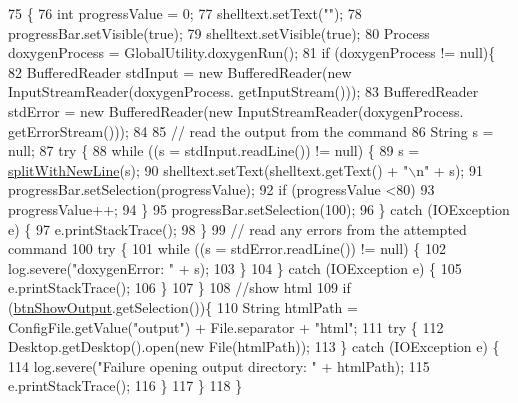 \begin{DoxyCode}
75                               \{
76         \textcolor{keywordtype}{int} progressValue = 0;
77         shelltext.setText(\textcolor{stringliteral}{""});
78         progressBar.setVisible(\textcolor{keyword}{true});
79         shelltext.setVisible(\textcolor{keyword}{true});
80         Process doxygenProcess = GlobalUtility.doxygenRun();
81         \textcolor{keywordflow}{if} (doxygenProcess != null)\{
82             BufferedReader stdInput = \textcolor{keyword}{new} BufferedReader(\textcolor{keyword}{new} InputStreamReader(doxygenProcess.
      getInputStream()));
83             BufferedReader stdError = \textcolor{keyword}{new} BufferedReader(\textcolor{keyword}{new} InputStreamReader(doxygenProcess.
      getErrorStream()));
84 
85             \textcolor{comment}{// read the output from the command}
86             String s = null;
87             \textcolor{keywordflow}{try} \{
88                 \textcolor{keywordflow}{while} ((s = stdInput.readLine()) != null) \{
89                     s = \hyperlink{classit_1_1isislab_1_1masonhelperdocumentation_1_1mason_1_1wizards_1_1_q___end_wizard_a1cdec1efdad895973386d4679b790a1c}{splitWithNewLine}(s);
90                     shelltext.setText(shelltext.getText() + \textcolor{stringliteral}{"\(\backslash\)n"} + s);
91                     progressBar.setSelection(progressValue);
92                     \textcolor{keywordflow}{if} (progressValue <80)
93                         progressValue++;
94                 \}
95                 progressBar.setSelection(100);
96             \} \textcolor{keywordflow}{catch} (IOException e) \{
97                 e.printStackTrace();
98             \}
99             \textcolor{comment}{// read any errors from the attempted command}
100             \textcolor{keywordflow}{try} \{
101                 \textcolor{keywordflow}{while} ((s = stdError.readLine()) != null) \{                 
102                     log.severe(\textcolor{stringliteral}{"doxygenError: "} + s);
103                 \}
104             \} \textcolor{keywordflow}{catch} (IOException e) \{
105                 e.printStackTrace();
106             \}
107         \}
108         \textcolor{comment}{//show html}
109         \textcolor{keywordflow}{if} (\hyperlink{classit_1_1isislab_1_1masonhelperdocumentation_1_1mason_1_1wizards_1_1_q___end_wizard_adabc78dc53c9ffd3c77d6e453db02cb6}{btnShowOutput}.getSelection())\{
110             String htmlPath = ConfigFile.getValue(\textcolor{stringliteral}{"output"}) + File.separator + \textcolor{stringliteral}{"html"};
111             \textcolor{keywordflow}{try} \{
112                 Desktop.getDesktop().open(\textcolor{keyword}{new} File(htmlPath));
113             \} \textcolor{keywordflow}{catch} (IOException e) \{
114                 log.severe(\textcolor{stringliteral}{"Failure opening output directory: "} + htmlPath); 
115                 e.printStackTrace();
116             \}
117         \}
118     \}
\end{DoxyCode}


